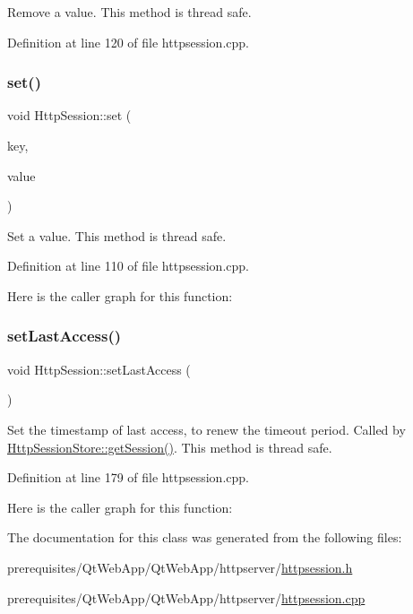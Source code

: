 Remove a value. This method is thread safe. 

Definition at line 120 of file httpsession.\+cpp.

\mbox{\label{classstefanfrings_1_1_http_session_a777e082016803939b9ba5b7e4a7c9ab0}} 
\subsubsection{\texorpdfstring{set()}{set()}}
{\footnotesize\ttfamily void Http\+Session\+::set (\begin{DoxyParamCaption}\item[{const Q\+Byte\+Array \&}]{key,  }\item[{const Q\+Variant \&}]{value }\end{DoxyParamCaption})}

Set a value. This method is thread safe. 

Definition at line 110 of file httpsession.\+cpp.

Here is the caller graph for this function\+:
\mbox{\label{classstefanfrings_1_1_http_session_a3e27faa5905e05aefa8feca7fbddfb70}} 
\subsubsection{\texorpdfstring{set\+Last\+Access()}{setLastAccess()}}
{\footnotesize\ttfamily void Http\+Session\+::set\+Last\+Access (\begin{DoxyParamCaption}{ }\end{DoxyParamCaption})}

Set the timestamp of last access, to renew the timeout period. Called by \mbox{\hyperlink{classstefanfrings_1_1_http_session_store_aeaf8409e1844366c12f18fd34d477a31}{Http\+Session\+Store\+::get\+Session()}}. This method is thread safe. 

Definition at line 179 of file httpsession.\+cpp.

Here is the caller graph for this function\+:


The documentation for this class was generated from the following files\+:\begin{DoxyCompactItemize}
\item 
prerequisites/\+Qt\+Web\+App/\+Qt\+Web\+App/httpserver/\mbox{\hyperlink{httpsession_8h}{httpsession.\+h}}\item 
prerequisites/\+Qt\+Web\+App/\+Qt\+Web\+App/httpserver/\mbox{\hyperlink{httpsession_8cpp}{httpsession.\+cpp}}\end{DoxyCompactItemize}
